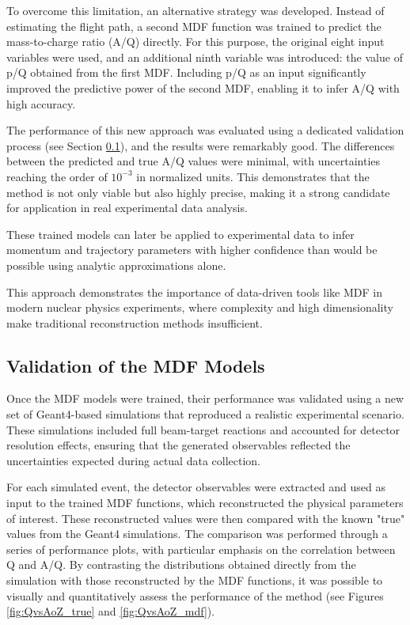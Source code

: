 To overcome this limitation, an alternative strategy was developed. Instead of estimating the flight path, a second \gls{MDF} function was trained to predict the mass-to-charge ratio (A/Q) directly. For this purpose, the original eight input variables were used, and an additional ninth variable was introduced: the value of p/Q obtained from the first \gls{MDF}. Including p/Q as an input significantly improved the predictive power of the second \gls{MDF}, enabling it to infer A/Q with high accuracy.

The performance of this new approach was evaluated using a dedicated validation process (see Section \ref{MDFValidation}), and the results were remarkably good. The differences between the predicted and true A/Q values were minimal, with uncertainties reaching the order of $10^{-3}$ in normalized units. This demonstrates that the method is not only viable but also highly precise, making it a strong candidate for application in real experimental data analysis.


These trained models can later be applied to experimental data to infer momentum and trajectory parameters with higher confidence than would be possible using analytic approximations alone.

This approach demonstrates the importance of data-driven tools like \gls{MDF} in modern nuclear physics experiments, where complexity and high dimensionality make traditional reconstruction methods insufficient.

\subsection{Validation of the MDF Models}
\label{MDFValidation}

Once the \gls{MDF} models were trained, their performance was validated using a new set of Geant4-based simulations that reproduced a realistic experimental scenario. These simulations included full beam-target reactions and accounted for detector resolution effects, ensuring that the generated observables reflected the uncertainties expected during actual data collection.

For each simulated event, the detector observables were extracted and used as input to the trained \gls{MDF} functions, which reconstructed the physical parameters of interest. These reconstructed values were then compared with the known "true" values from the Geant4 simulations. The comparison was performed through a series of performance plots, with particular emphasis on the correlation between Q and A/Q. By contrasting the distributions obtained directly from the simulation with those reconstructed by the \gls{MDF} functions, it was possible to visually and quantitatively assess the performance of the method (see Figures \ref{fig:QvsAoZ_true} and \ref{fig:QvsAoZ_mdf}).


